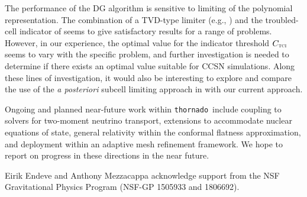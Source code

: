 \documentclass[letterpaper]{jpconf}
\newcommand{\TCI}{\textnormal{\tiny\textsc{TCI}}}
\newcommand{\thornado}{\texttt{thornado}}
\begin{document}
The performance of the DG algorithm is sensitive to limiting of the polynomial representation.  
The combination of a TVD-type limiter (e.g., \cite{cockburnShu_1998}) and the troubled-cell indicator of \cite{fuShu_2017} seems to give satisfactory results for a range of problems.  
However, in our experience, the optimal value for the indicator threshold $C_{\TCI}$ seems to vary with the specific problem, and further investigation is needed to determine if there exists an optimal value suitable for CCSN simulations.  
Along these lines of investigation, it would also be interesting to explore and compare the use of the {\it a posteriori} subcell limiting approach in \cite{dumbser_etal_2014,fambri_etal_2018} with our current approach.  

Ongoing and planned near-future work within \thornado\ include coupling to solvers for two-moment neutrino transport, extensions to accommodate nuclear equations of state, general relativity within the conformal flatness approximation, and deployment within an adaptive mesh refinement framework.  
We hope to report on progress in these directions in the near future.  

\ack Eirik Endeve and Anthony Mezzacappa acknowledge support from the NSF Gravitational Physics Program (NSF-GP 1505933 and 1806692).
\end{document}
